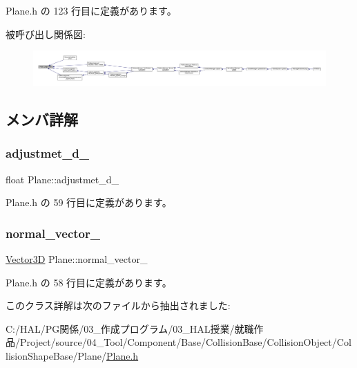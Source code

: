  Plane.\+h の 123 行目に定義があります。

被呼び出し関係図\+:
\nopagebreak
\begin{figure}[H]
\begin{center}
\leavevmode
\includegraphics[width=350pt]{class_plane_af0315d2a7aebf6057410799f127b6c17_icgraph}
\end{center}
\end{figure}


\subsection{メンバ詳解}
\mbox{\label{class_plane_ab43e3263bd879ea710936d85cacb6006}} 
\subsubsection{\texorpdfstring{adjustmet\+\_\+d\+\_\+}{adjustmet\_d\_}}
{\footnotesize\ttfamily float Plane\+::adjustmet\+\_\+d\+\_\+}



 Plane.\+h の 59 行目に定義があります。

\mbox{\label{class_plane_abdf97ffa29f452b0faaae0b7d06f4ee5}} 
\subsubsection{\texorpdfstring{normal\+\_\+vector\+\_\+}{normal\_vector\_}}
{\footnotesize\ttfamily \mbox{\hyperlink{class_vector3_d}{Vector3D}} Plane\+::normal\+\_\+vector\+\_\+}



 Plane.\+h の 58 行目に定義があります。



このクラス詳解は次のファイルから抽出されました\+:\begin{DoxyCompactItemize}
\item 
C\+:/\+H\+A\+L/\+P\+G関係/03\+\_\+作成プログラム/03\+\_\+\+H\+A\+L授業/就職作品/\+Project/source/04\+\_\+\+Tool/\+Component/\+Base/\+Collision\+Base/\+Collision\+Object/\+Collision\+Shape\+Base/\+Plane/\mbox{\hyperlink{_plane_8h}{Plane.\+h}}\end{DoxyCompactItemize}
